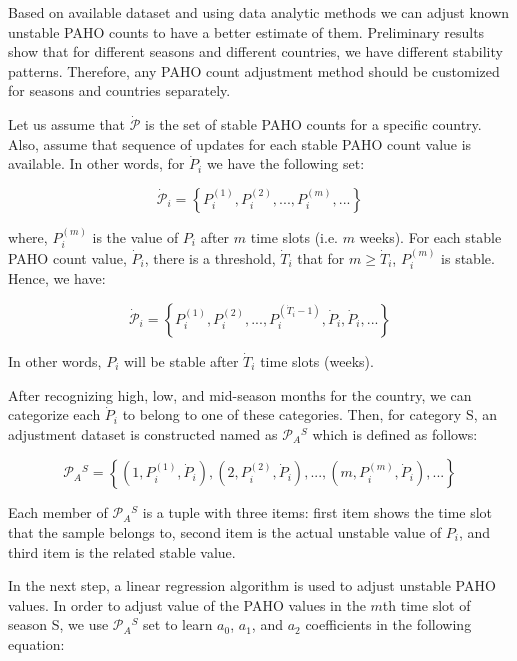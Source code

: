 
Based on available dataset and using data analytic methods we can adjust known unstable PAHO counts to have a better estimate of them. Preliminary results show that for different seasons and different countries, we have different stability patterns. Therefore, any PAHO count adjustment method should be customized for seasons and countries separately. 

Let us assume that $\dot{\mathcal{P}}$ is the set of stable PAHO counts for a specific country. Also, assume that sequence of updates for each stable PAHO count value is available. In other words, for $\dot{P}_i$ we have the following set:
 
\begin{equation}
\dot{\mathcal{P}}_i = \left \{P_i^{(1)},P_i^{(2)},...,P_i^{(m)},...  \right \}
\end{equation}

where, $P_i^{(m)}$ is the value of $P_i$ after $m$ time slots (i.e. $m$ weeks). For each stable PAHO count value, $\dot{P}_i$, there is a threshold, $\dot{T}_i$ that for $m \ge \dot{T}_i$, $P_i^{(m)}$ is stable. Hence, we have:

\begin{equation}
\dot{\mathcal{P}}_i = \left \{P_i^{(1)},P_i^{(2)},...,P_i^{(\dot{T}_i-1)},\dot{P}_i,\dot{P}_i,...  \right \}
\end{equation}

In other words, $P_i$ will be stable after $\dot{T}_i$ time slots (weeks). 

After recognizing high, low, and mid-season months for the country, we can categorize each $\dot{P}_i$ to belong to one of these categories. Then, for category S, an adjustment dataset is constructed named as $\mathcal{P}_A{^S}$ which is defined as follows:

\begin{equation}
\mathcal{P}_A{^S} = \left \{ (1,P_i^{(1)},\dot{P}_i),(2,P_i^{(2)},\dot{P}_i),...,(m,P_i^{(m)},\dot{P}_i), ...  \right \}
\end{equation}

Each member of $\mathcal{P}_A{^S}$ is a tuple with three items: first item shows the time slot that the sample belongs to, second item is the actual unstable value of $P_i$, and third item is the related stable value.

In the next step, a linear regression algorithm is used to adjust unstable PAHO values. In order to adjust value of the PAHO values in the $m$th time slot of season S, we use $\mathcal{P}_A{^S}$ set to learn $a_0$, $a_1$, and $a_2$ coefficients in the following equation:

